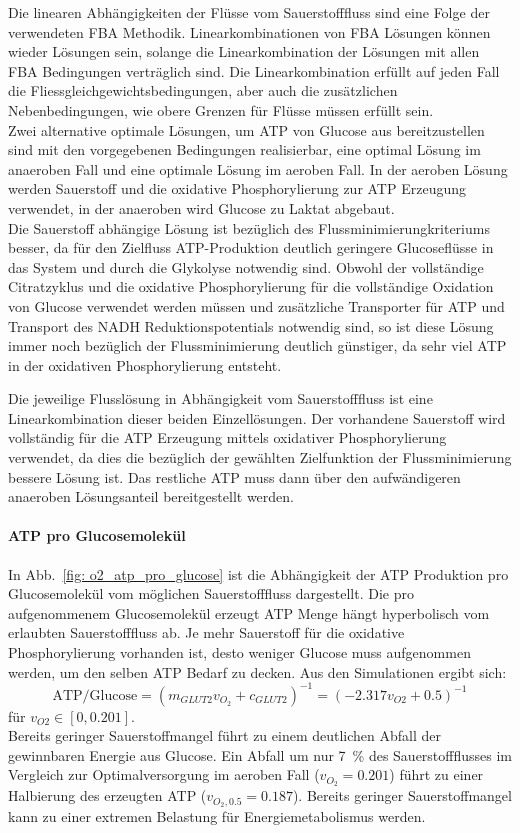 Die linearen Abhängigkeiten der Flüsse vom Sauerstofffluss sind eine Folge der verwendeten FBA Methodik. Linearkombinationen von FBA Lösungen können wieder Lösungen sein, solange die Linearkombination der Lösungen mit allen FBA Bedingungen verträglich sind. Die Linearkombination erfüllt auf jeden Fall die Fliessgleichgewichtsbedingungen, aber auch die zusätzlichen Nebenbedingungen, wie obere Grenzen für Flüsse müssen erfüllt sein.\\
Zwei alternative optimale Lösungen, um ATP von Glucose aus bereitzustellen sind mit den vorgegebenen Bedingungen realisierbar, eine optimal Lösung im anaeroben Fall und eine optimale Lösung im aeroben Fall. In der aeroben Lösung werden Sauerstoff und die oxidative Phosphorylierung zur ATP Erzeugung verwendet, in der anaeroben wird Glucose zu Laktat abgebaut.\\
Die Sauerstoff abhängige Lösung ist bezüglich des Flussminimierungkriteriums besser, da für den Zielfluss ATP-Produktion deutlich geringere Glucoseflüsse in das System und durch die Glykolyse notwendig sind. Obwohl der vollständige Citratzyklus und die oxidative Phosphorylierung für die vollständige Oxidation von Glucose verwendet werden müssen und zusätzliche Transporter für ATP und Transport des NADH Reduktionspotentials notwendig sind, so ist diese Lösung immer noch bezüglich der Flussminimierung deutlich günstiger, da sehr viel ATP in der oxidativen Phosphorylierung entsteht.

Die jeweilige Flusslösung in Abhängigkeit vom Sauerstofffluss ist eine Linearkombination dieser beiden Einzellösungen. Der vorhandene Sauerstoff wird vollständig für die ATP Erzeugung mittels oxidativer Phosphorylierung verwendet, da dies die bezüglich der gewählten Zielfunktion der Flussminimierung bessere Lösung ist. Das restliche ATP muss dann über den aufwändigeren anaeroben Lösungsanteil bereitgestellt werden.


\paragraph{ATP pro Glucosemolekül}
In Abb.~\ref{fig: o2_atp_pro_glucose} ist die Abhängigkeit der ATP Produktion pro Glucosemolekül vom möglichen Sauerstofffluss dargestellt. Die pro aufgenommenem Glucosemolekül erzeugt ATP Menge hängt hyperbolisch vom erlaubten Sauerstofffluss ab. Je mehr Sauerstoff für die oxidative Phosphorylierung vorhanden ist, desto weniger Glucose muss aufgenommen werden, um den selben ATP Bedarf zu decken. Aus den Simulationen ergibt sich:
\begin{equation}
 \text{ATP/Glucose} = (m_{GLUT2} v_{O_2} + c_{GLUT2})^{-1} = (-2.317 v_{O2} + 0.5)^{-1}
\label{eq: atp_glucose}
\end{equation}
für $v_{O2} \in [0, 0.201]$.\\
Bereits geringer Sauerstoffmangel führt zu einem deutlichen Abfall der gewinnbaren Energie aus Glucose. Ein Abfall um nur 7~\% des Sauerstoffflusses im Vergleich zur Optimalversorgung im aeroben Fall ($v_{O_2}=0.201$) führt zu einer Halbierung des erzeugten ATP ($v_{O_2, 0.5} = 0.187$). Bereits geringer Sauerstoffmangel kann zu einer extremen Belastung für Energiemetabolismus werden.\\


